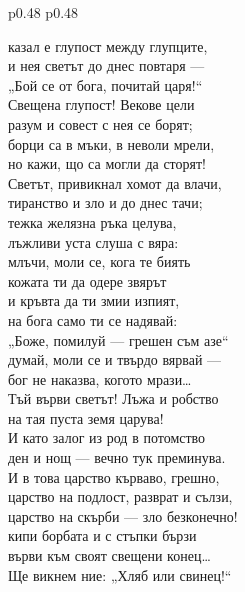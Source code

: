 \documentclass[12pt,a4paper]{article}
\begin{document}
\begin{table}[h]
\begin{tabular}{p{0.48\textwidth} p{0.48\textwidth}}
\begin{minipage}[t]{\linewidth}

казал е глупост между глупците,\\
и нея светът до днес повтаря —\\
„Бой се от бога, почитай царя!“\\

Свещена глупост! Векове цели\\
разум и совест с нея се борят;\\
борци са в мъки, в неволи мрели,\\
но кажи, що са могли да сторят!\\
Светът, привикнал хомот да влачи,\\
тиранство и зло и до днес тачи;\\
тежка желязна ръка целува,\\
лъжливи уста слуша с вяра:\\
млъчи, моли се, кога те биять\\
кожата ти да одере звярът\\
и кръвта да ти змии изпият,\\
на бога само ти се надявай:\\
„Боже, помилуй — грешен съм азе“\\
думай, моли се и твърдо вярвай —\\
бог не наказва, когото мрази…\\
Тъй върви светът! Лъжа и робство\\
на тая пуста земя царува!\\
И като залог из род в потомство\\
ден и нощ — вечно тук преминува.\\
И в това царство кърваво, грешно,\\
царство на подлост, разврат и сълзи,\\
царство на скърби — зло безконечно!\\
кипи борбата и с стъпки бързи\\
върви към своят свещени конец…\\
Ще викнем ние: „Хляб или свинец!“\\


\end{minipage}

\\

\end{tabular}
\end{table}
\end{document}
